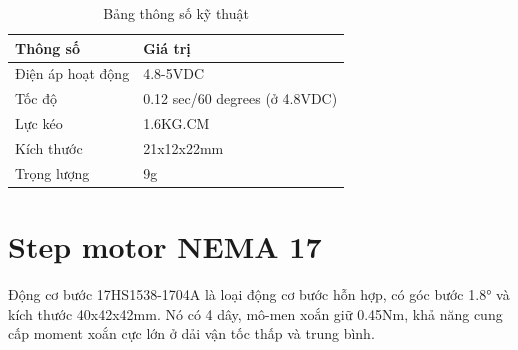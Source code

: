 \documentclass[12pt]{report}
\begin{document}
    \begin{table}[H] %
        \centering %
        \begin{tabular}{ll} %
            \toprule %
            Thông số & Giá trị \\
            \midrule %
            Điện áp hoạt động & 4.8-5VDC \\
            Tốc độ & 0.12 sec/60 degrees (ở 4.8VDC) \\
            Lực kéo & 1.6KG.CM \\
            Kích thước & 21x12x22mm \\
            Trọng lượng & 9g \\
            \bottomrule %
        \end{tabular}
        \caption{Bảng thông số kỹ thuật} %
    \end{table}


\section{Step motor NEMA 17}
Động cơ bước 17HS1538-1704A là loại động cơ bước hỗn hợp, có góc bước 1.8° và kích thước 40x42x42mm. Nó có 4 dây, mô-men xoắn giữ 0.45Nm, khả năng cung cấp moment xoắn cực lớn ở dải vận tốc thấp và trung bình.
\end{document}
